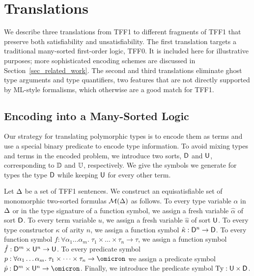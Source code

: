 \section{Translations} \label{sec:trans}

We describe three translations from TFF1 to different fragments of TFF1 that
preserve both satisfiability and unsatisfiability. The first translation targets
a traditional many-sorted first-order logic, TFF0. It is included here for
illustrative purposes; more sophisticated encoding schemes are discussed in
Section~\ref{sec_related_work}. The second and third translations eliminate
ghost type arguments and type quantifiers, two features that are not directly
supported by ML-style formalisms, which otherwise are a good match for TFF1.

\subsection{Encoding into a Many-Sorted Logic} \label{ssec:tff0}

Our strategy for translating polymorphic types is to encode them as terms and
use a special binary predicate to encode type information. To avoid mixing types
and terms in the encoded problem, we introduce two sorts, $\mathsf{D}$ and $\mathsf{U}$,
corresponding to $\mathbb{D}$ and $\mathbb{U}$, respectively. We give the symbols we
generate for types the type $\mathsf{D}$ while keeping $\mathsf{U}$ for every other term.

Let $\mathrm{\Delta}$ be a set of TFF1 sentences.
We construct an equisatisfiable set of monomorphic two-sorted
formulas $\mathcal{M}(\mathrm{\Delta})$ as follows.
%
To every type variable $\alpha$ in $\mathrm{\Delta}$ or in the type signature of a function
symbol, we assign a fresh variable $\hat{\alpha}$ of sort $\mathsf{D}$.
To every term variable $u$, we assign
a fresh variable $\hat{u}$ of sort $\mathsf{U}$.
To every type constructor $\kappa$ of arity $n$, we assign
a function symbol $\hat{\kappa} : \mathsf{D}^n \to \mathsf{D}$.
To every function symbol $f : \forall \alpha_1\dots\alpha_m .\; \tau_1 \times \dots \times \tau_n \to \tau$,
we assign a function symbol $\hat{f} : \mathsf{D}^m \times \mathsf{U}^n \to \mathsf{U}$.
To every predicate symbol $p : \forall \alpha_1\dots\alpha_m .\; \tau_1 \times \dots \times \tau_n \to \omicron$
we assign a predicate symbol $\hat{p} : \typ^m \times \und^n \to \omicron$.
Finally, we introduce the predicate symbol $\mathrm{Ty} : \mathsf{U} \times \mathsf{D}$.

